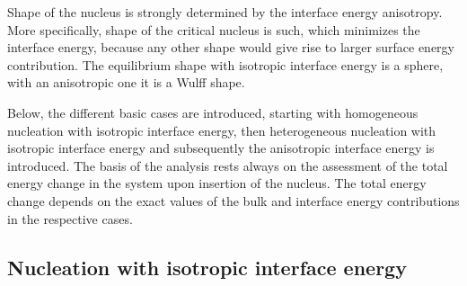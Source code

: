 
Shape of the nucleus is strongly determined by the interface energy anisotropy. More specifically, shape of the critical nucleus is such, which minimizes the interface energy, because any other shape would give rise to larger surface energy contribution. The equilibrium shape with isotropic interface energy is a sphere, with an anisotropic one it is a Wulff shape.

Below, the different basic cases are introduced, starting with homogeneous nucleation with isotropic interface energy, then heterogeneous nucleation with isotropic interface energy and subsequently the anisotropic interface energy is introduced. The basis of the analysis rests always on the assessment of the total energy change in the system upon insertion of the nucleus. The total energy change depends on the exact values of the bulk and interface energy contributions in the respective cases. 


    \subsection{Nucleation with isotropic interface energy}
